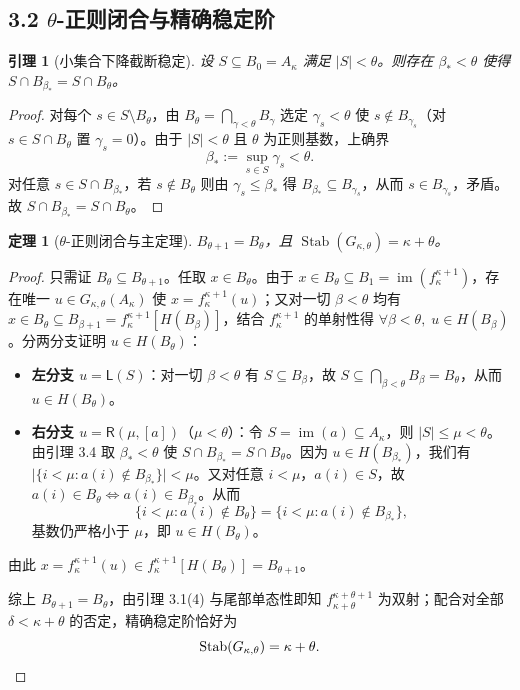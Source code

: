 \documentclass[11pt,a4paper]{ctexart}
\theoremstyle{definition}
\theoremstyle{plain}
\newtheorem{lemma}[definition]{引理}
\newtheorem{theorem}[definition]{定理}
\newcommand{\Stab}{\operatorname{Stab}}
\newcommand{\im}{\operatorname{im}}
\begin{document}
\subsection*{3.2 $\theta$-正则闭合与精确稳定阶}

\begin{lemma}[小集合下降截断稳定]
设 $S \subseteq B_0 = A_\kappa$ 满足 $|S| < \theta$。则存在 $\beta_* < \theta$ 使得 $S \cap B_{\beta_*} = S \cap B_\theta$。
\end{lemma}

\begin{proof}
对每个 $s \in S \setminus B_\theta$，由 $B_\theta = \bigcap_{\gamma < \theta} B_\gamma$ 选定 $\gamma_s < \theta$ 使 $s \notin B_{\gamma_s}$（对 $s \in S \cap B_\theta$ 置 $\gamma_s = 0$）。由于 $|S| < \theta$ 且 $\theta$ 为正则基数，上确界
\[
  \beta_* := \sup_{s \in S} \gamma_s < \theta.
\]
对任意 $s \in S \cap B_{\beta_*}$，若 $s \notin B_\theta$ 则由 $\gamma_s \le \beta_*$ 得 $B_{\beta_*} \subseteq B_{\gamma_s}$，从而 $s \in B_{\gamma_s}$，矛盾。故 $S \cap B_{\beta_*} = S \cap B_\theta$。
\end{proof}

\begin{theorem}[$\theta$-正则闭合与主定理]
$B_{\theta+1} = B_\theta$，且 $\Stab(G_{\kappa,\theta}) = \kappa + \theta$。
\end{theorem}

\begin{proof}
只需证 $B_\theta \subseteq B_{\theta+1}$。任取 $x \in B_\theta$。由于 $x \in B_\theta \subseteq B_1 = \im(f_\kappa^{\kappa+1})$，存在唯一 $u \in G_{\kappa,\theta}(A_\kappa)$ 使 $x = f_\kappa^{\kappa+1}(u)$；又对一切 $\beta < \theta$ 均有 $x \in B_\theta \subseteq B_{\beta+1} = f_\kappa^{\kappa+1}[H(B_\beta)]$，结合 $f_\kappa^{\kappa+1}$ 的单射性得 $\forall \beta < \theta,\; u \in H(B_\beta)$。分两分支证明 $u \in H(B_\theta)$：
\begin{itemize}[leftmargin=2em]
  \item \textbf{左分支 $u = \mathsf{L}(S)$}：对一切 $\beta < \theta$ 有 $S \subseteq B_\beta$，故 $S \subseteq \bigcap_{\beta < \theta} B_\beta = B_\theta$，从而 $u \in H(B_\theta)$。
  \item \textbf{右分支 $u = \mathsf{R}(\mu, [a])$}（$\mu < \theta$）：令 $S = \im(a) \subseteq A_\kappa$，则 $|S| \le \mu < \theta$。由引理 3.4 取 $\beta_* < \theta$ 使 $S \cap B_{\beta_*} = S \cap B_\theta$。因为 $u \in H(B_{\beta_*})$，我们有 $\bigl|\{i < \mu : a(i) \notin B_{\beta_*}\}\bigr| < \mu$。又对任意 $i < \mu$，$a(i) \in S$，故 $a(i) \in B_\theta \iff a(i) \in B_{\beta_*}$。从而
    \[
      \{i < \mu : a(i) \notin B_\theta\} = \{i < \mu : a(i) \notin B_{\beta_*}\},
    \]
    基数仍严格小于 $\mu$，即 $u \in H(B_\theta)$。
\end{itemize}
由此 $x = f_\kappa^{\kappa+1}(u) \in f_\kappa^{\kappa+1}[H(B_\theta)] = B_{\theta+1}$。

综上 $B_{\theta+1} = B_\theta$，由引理 3.1(4) 与尾部单态性即知 $f_{\kappa+\theta}^{\kappa+\theta+1}$ 为双射；配合对全部 $\delta < \kappa + \theta$ 的否定，精确稳定阶恰好为
\[
  \Stab(G_{\kappa,\theta}) = \kappa + \theta. \qedhere
\]
\end{proof}
\end{document}
